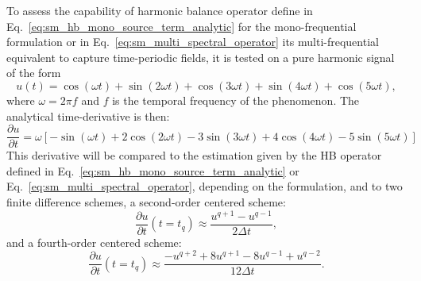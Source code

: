 
To assess the capability of harmonic balance operator define 
in Eq.~\eqref{eq:sm_hb_mono_source_term_analytic} for the mono-frequential
formulation or in Eq.~\eqref{eq:sm_multi_spectral_operator} 
its multi-frequential equivalent to
capture time-periodic fields, it is tested on a pure
harmonic signal of the form
\begin{equation}
    \label{eq:sum_sin}
    u(t) = \cos(\omega t) + \sin(2 \omega t) +
    \cos(3 \omega t) + \sin(4 \omega t) + \cos(5 \omega t),
\end{equation}
where $\omega = 2 \pi f$ and $f$ is the temporal frequency of
the phenomenon.
The analytical time-derivative is then:
\begin{equation}
    \label{eq:sum_sin_deriv}
    \frac{\partial u}{\partial t} = 
    \omega\left[ -\sin(\omega t) + 
    2\cos(2 \omega t) -
    3\sin(3 \omega t) + 
    4\cos(4 \omega t) -
    5\sin(5 \omega t)\right]
\end{equation}
This derivative will be compared to the estimation
given by the HB operator defined in Eq.~\eqref{eq:sm_hb_mono_source_term_analytic}
or Eq.~\eqref{eq:sm_multi_spectral_operator}, depending 
on the formulation,
and to two finite difference schemes,
a second-order centered scheme:
\begin{equation}
    \frac{\partial u}{\partial t} (t=t_q) \approx 
    \frac{u^{q+1} - u^{q-1}}{2 \Delta t},
    \label{eq:hb_op_center2}
\end{equation}
and a fourth-order centered scheme:
\begin{equation}
    \frac{\partial u}{\partial t} (t=t_q) \approx 
    \frac{-u^{q+2} + 8 u^{q+1} - 8 u^{q-1} + u^{q-2}}{12\Delta t}.
    \label{eq:hb_op_center4}
\end{equation}

